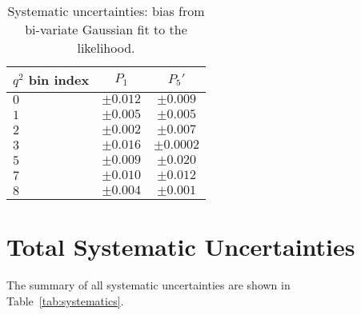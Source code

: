 \begin{table*}[!htb]
  \begin {center}
    \begin{small}
      \caption{Systematic uncertainties: bias from bi-variate Gaussian fit to the likelihood.
        \label{tab:rangeGausFit}}
      \begin{tabular}{l|cc}
        \hline
        $q^2$ bin index   & $P_1$ & $P_5'$ \\
        \hline
        $ 0 $    &   $\pm0.012$ & $\pm0.009 $   \\
        $ 1 $    &   $\pm0.005$ & $\pm0.005 $   \\
        $ 2 $    &   $\pm0.002$ & $\pm0.007 $   \\
        $ 3 $    &   $\pm0.016$ & $\pm0.0002$   \\
        $ 5 $    &   $\pm0.009$ & $\pm0.020 $   \\
        $ 7 $    &   $\pm0.010$ & $\pm0.012 $   \\
        $ 8 $    &   $\pm0.004$ & $\pm0.001 $   \\
        \hline
      \end{tabular}
    \end{small}
  \end{center}
\end{table*}

\section{Total Systematic Uncertainties}
\label{sec:sys-total}

The summary of all systematic uncertainties are shown in Table~\ref{tab:systematics}.

